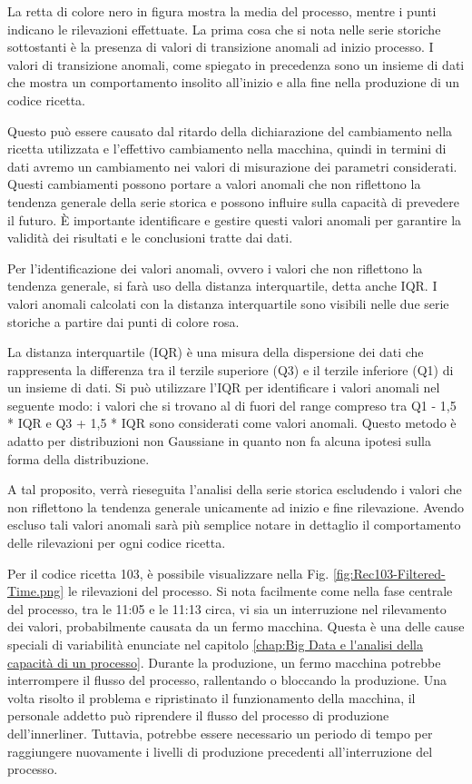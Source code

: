La retta di colore nero in figura mostra la media del processo, mentre i punti indicano le rilevazioni effettuate.
La prima cosa che si nota nelle serie storiche sottostanti è la presenza di valori di transizione anomali ad inizio processo.
I valori di transizione anomali, come spiegato in precedenza sono un insieme di dati che mostra un comportamento insolito all'inizio e alla fine nella produzione di un codice ricetta. 

Questo può essere causato dal ritardo della dichiarazione del cambiamento nella ricetta utilizzata e l'effettivo cambiamento nella macchina, quindi in termini di dati avremo un cambiamento nei valori di misurazione dei parametri considerati. 
Questi cambiamenti possono portare a valori anomali che non riflettono la tendenza generale della serie storica e possono influire sulla capacità di prevedere il futuro.
È importante identificare e gestire questi valori anomali per garantire la validità dei risultati e le conclusioni tratte dai dati.


Per l'identificazione dei valori anomali, ovvero i valori che non riflettono la tendenza generale, si farà uso della distanza interquartile, detta anche IQR.
I valori anomali calcolati con la distanza interquartile sono visibili nelle due serie storiche a partire dai punti di colore rosa.


La distanza interquartile (IQR) è una misura della dispersione dei dati che rappresenta la differenza tra il terzile superiore (Q3) e il terzile inferiore (Q1) di un insieme di dati. Si può utilizzare l'IQR per identificare i valori anomali nel seguente modo: i valori che si trovano al di fuori del range compreso tra Q1 - 1,5 * IQR e Q3 + 1,5 * IQR sono considerati come valori anomali. Questo metodo è adatto per distribuzioni non Gaussiane in quanto non fa alcuna ipotesi sulla forma della distribuzione.
\cite{WikipediaIQR}


A tal proposito, verrà rieseguita l'analisi della serie storica escludendo i valori che non riflettono la tendenza generale unicamente ad inizio e fine rilevazione.
Avendo escluso tali valori anomali sarà più semplice notare in dettaglio il comportamento delle rilevazioni per ogni codice ricetta.


Per il codice ricetta 103, è possibile visualizzare nella Fig. \ref{fig:Rec103-Filtered-Time.png} le rilevazioni del processo.
Si nota facilmente come nella fase centrale del processo, tra le 11:05 e le 11:13 circa, vi sia un interruzione nel rilevamento dei valori, probabilmente causata da un fermo macchina.
Questa è una delle cause speciali di variabilità enunciate nel capitolo \ref{chap:Big Data e l'analisi della capacità di un processo}. 
Durante la produzione, un fermo macchina potrebbe interrompere il flusso del processo, rallentando o bloccando la produzione.
Una volta risolto il problema e ripristinato il funzionamento della macchina, il personale addetto può riprendere il flusso del processo di produzione dell'innerliner. Tuttavia, potrebbe essere necessario un periodo di tempo per raggiungere nuovamente i livelli di produzione precedenti all'interruzione del processo.

